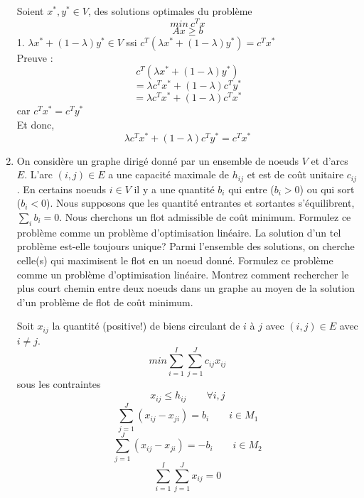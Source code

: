 \begin{enumerate}
    \begin{solution}

      Soient $x^{*}, y^{*} \in V$, des solutions optimales du problème 
      $$ min ~c^{T}x$$
      $$ Ax \geq b$$
      1. $\lambda x^{*} + (1-\lambda)y^{*} \in V$ ssi $c^{T}(\lambda x^{*} + (1-\lambda)y^{*}) = c^{T}x^{*}$\\
      \newline
      Preuve : 
      $$c^{T}(\lambda x^{*} + (1-\lambda)y^{*}) $$
      $$= \lambda c^{T}x^{*}  + (1-\lambda)c^{T}y^{*}$$
      $$ = \lambda c^{T}x^{*}  + (1-\lambda)c^{T}x^{*}$$
      car $c^{T}x^{*} = c^{T}y^{*}$ \\
      \newline
      Et donc, \\
      $$\lambda c^{T}x^{*}  + (1-\lambda)c^{T}y^{*} = c^{T}x^{*}$$

    \end{solution}


  \item On considère  un graphe dirigé donné par un ensemble de noeuds $V$ et d'arcs $E$. L'arc
    $(i, j) \in E$ a une  capacité maximale de
    $h_{ij}$ et est de coût unitaire
    $c_{ij}$. En certains noeuds
    $i \in V$ il y a une quantité
    $b_i$ qui entre  ($b_i >0$) ou qui sort ($b_i <0$). Nous supposons que les quantité entrantes et sortantes s'équilibrent, $\sum_i b_i=0$. Nous
    cherchons un flot admissible de coût minimum.  Formulez ce problème comme un problème d'optimisation linéaire. La solution d'un tel problème est-elle
    toujours unique? Parmi l'ensemble des solutions, on cherche celle(s) qui maximisent le flot en un noeud donn\'e.
    Formulez ce probl\`eme comme un probl\`eme d'optimisation lin\'eaire. Montrez comment  rechercher le   plus court chemin entre deux noeuds dans un
    graphe au moyen de la solution d'un  problème de flot de coût minimum.

    \begin{solution}
      Soit $x_{ij}$ la quantité (positive!) de biens circulant de $i$ à $j$ avec $(i,j) \in E$ avec $i \ne j$. 
      $$ min \sum_{i=1}^I \sum_{j=1}^J c_{ij}x_{ij}$$
      sous les contraintes
      $$x_{ij} \le h_{ij} \qquad \forall i,j$$
      $$\sum_{j=1}^J (x_{ij} - x_{ji}) = b_{i} \qquad i \in M_{1}$$
      $$\sum_{j=1}^J (x_{ij} - x_{ji}) = -b_{i} \qquad i \in M_{2}$$
      $$\sum_{i=1}^I \sum_{j=1}^J x_{ij} = 0 $$

    \end{solution}



\end{enumerate}
